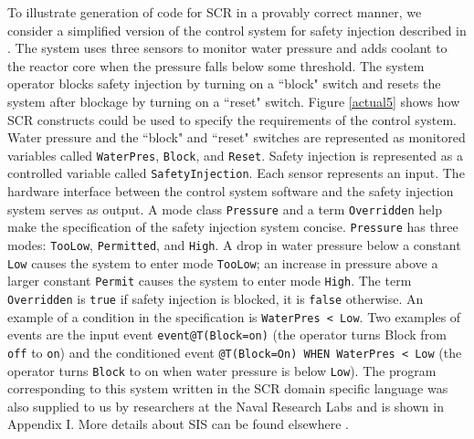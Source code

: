 \documentclass{entcs}
\begin{document}

To illustrate generation of code for SCR in a provably correct manner, 
we consider a simplified version of the control system for safety injection described 
in \cite{Constance96}. The system uses three sensors to monitor water pressure and adds coolant 
to the reactor core when the pressure falls below some threshold. The system operator blocks safety 
injection by turning on a ``block" switch and resets the system after blockage by turning on a ``reset" 
switch. Figure \ref{actual5} shows how SCR constructs could be used to specify the requirements of the control 
system. Water pressure and the ``block" and ``reset" switches are represented as monitored variables called
{\tt WaterPres}, {\tt Block}, and {\tt Reset}. Safety injection is represented as 
a controlled variable called {\tt SafetyInjection}. Each sensor represents an 
input. The hardware interface between the control system software and the safety injection 
system serves as output. 
A mode class {\tt Pressure} and a term {\tt Overridden} help make the specification of
the safety injection system concise. 
{\tt Pressure} has three modes: {\tt TooLow}, {\tt Permitted}, and {\tt High}. 
A drop in water pressure below a constant {\tt Low} 
causes the system to enter mode {\tt TooLow}; an increase in pressure above a 
larger constant {\tt Permit} causes the system to enter mode {\tt High}.
The term {\tt Overridden} is {\tt true} if safety injection is blocked, it is {\tt false} 
otherwise.  An example of a condition in the specification is {\tt WaterPres < Low}. 
Two examples of events are the input event {\tt event@T(Block=on)}
(the operator turns Block from {\tt off} to {\tt on}) and the conditioned event {\tt @T(Block=On) WHEN 
WaterPres < Low} (the operator turns {\tt Block} to on when water pressure is below 
{\tt Low}). 
The program corresponding to this system written in the SCR domain specific
language was also supplied to us by researchers at the Naval Research Labs and is shown 
in Appendix I. More details 
about SIS can be found elsewhere \cite{Constance96}.
\end{document}
